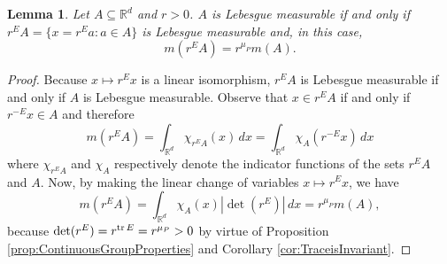 \documentclass[11pt]{article}
\newtheorem{lemma}[theorem]{Lemma}
\theoremstyle{remark}
\renewcommand\det{\operatorname{det}}
\begin{document}
\begin{lemma}\label{lemma:Scaling}
Let $A\subseteq\mathbb{R}^d$ and $r>0$.  $A$ is Lebesgue measurable if and only if $r^E A=\{x=r^E a:a\in A\}$ is Lebesgue measurable and, in this case,
\begin{equation*}
m(r^E A)=r^{\mu_P}m(A).
\end{equation*}
\end{lemma}

\begin{proof}
Because $x\mapsto r^E x$ is a linear isomorphism, $r^E A$ is Lebesgue measurable if and only if $A$ is Lebesgue measurable. Observe that $x\in r^E A$ if and only if $r^{-E}x\in A$ and therefore
\begin{equation*}
m(r^E A)=\int_{\mathbb{R}^d}\chi_{r^E A}(x)\,dx=\int_{\mathbb{R}^d}\chi_{A}(r^{-E}x)\,dx
\end{equation*}
where $\chi_{r^EA}$ and $\chi_{A}$ respectively denote the indicator functions of the sets $r^EA$ and $A$. Now, by making the linear change of variables $x\mapsto r^E x$, we have
\begin{equation*}
m(r^E A)=\int_{\mathbb{R}^d}\chi_A(x)|\det(r^E)|\,dx=r^{\mu_P}m(A),
\end{equation*}
because $\det(r^E)=r^{\tr E}=r^{\mu_P}>0$ by virtue of Proposition \ref{prop:ContinuousGroupProperties} and Corollary \ref{cor:TraceisInvariant}.
\end{proof}
\end{document}
